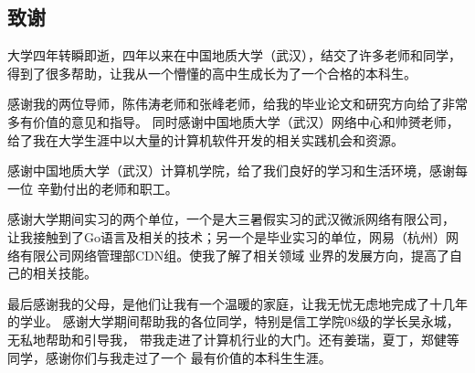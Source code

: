 \documentclass[twoside]{CUGThesis}
\begin{document}
	\begin{spacing}{2}
		\section*{致谢}
	\end{spacing}
	大学四年转瞬即逝，四年以来在中国地质大学（武汉），结交了许多老师和同学，
	得到了很多帮助，让我从一个懵懂的高中生成长为了一个合格的本科生。\par 
	感谢我的两位导师，陈伟涛老师和张峰老师，给我的毕业论文和研究方向给了非常多有价值的意见和指导。
	同时感谢中国地质大学（武汉）网络中心和帅赟老师，
	给了我在大学生涯中以大量的计算机软件开发的相关实践机会和资源。\par 
	感谢中国地质大学（武汉）计算机学院，给了我们良好的学习和生活环境，感谢每一位
	辛勤付出的老师和职工。\par
	感谢大学期间实习的两个单位，一个是大三暑假实习的武汉微派网络有限公司，
	让我接触到了Go语言及相关的技术；另一个是毕业实习的单位，网易（杭州）网络有限公司网络管理部CDN组。使我了解了相关领域
	业界的发展方向，提高了自己的相关技能。\par
	最后感谢我的父母，是他们让我有一个温暖的家庭，让我无忧无虑地完成了十几年的学业。
	感谢大学期间帮助我的各位同学，特别是信工学院08级的学长吴永城，无私地帮助和引导我，
	带我走进了计算机行业的大门。还有姜瑞，夏丁，郑健等同学，感谢你们与我走过了一个
	最有价值的本科生生涯。
	
	
	\clearpage
	
	
	
\end{document}
